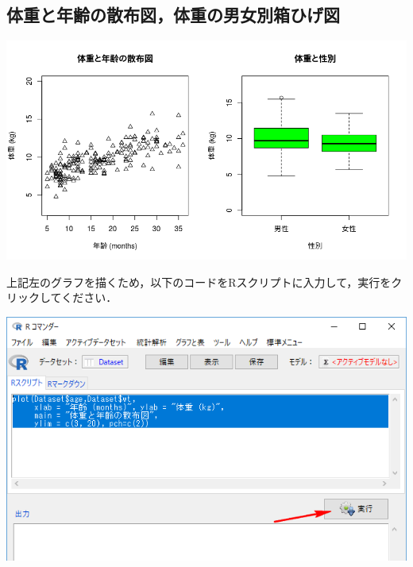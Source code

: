 \documentclass[11pt,]{problemset}
\newenvironment{Shaded}{\begin{snugshade}}{\end{snugshade}}
\newcommand{\DataTypeTok}[1]{\textcolor[rgb]{0.13,0.29,0.53}{#1}}
\newcommand{\DecValTok}[1]{\textcolor[rgb]{0.00,0.00,0.81}{#1}}
\newcommand{\KeywordTok}[1]{\textcolor[rgb]{0.13,0.29,0.53}{\textbf{#1}}}
\newcommand{\NormalTok}[1]{#1}
\newcommand{\OperatorTok}[1]{\textcolor[rgb]{0.81,0.36,0.00}{\textbf{#1}}}
\newcommand{\StringTok}[1]{\textcolor[rgb]{0.31,0.60,0.02}{#1}}
\begin{document}
\subsection{体重と年齢の散布図，体重の男女別箱ひげ図}

\begin{center}\includegraphics[width=0.85\linewidth]{pic/scatter00} \end{center}

上記左のグラフを描くため，以下のコードをRスクリプトに入力して，実行をクリックしてください．

\begin{Shaded}
\end{Shaded}

\bigskip

\begin{center}\includegraphics[width=0.8\linewidth]{pic/scatter01} \end{center}
\end{document}
